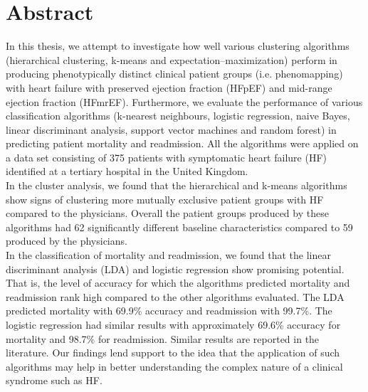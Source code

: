 \documentclass[../thesis.tex]{subfiles}
\begin{document}
\chapter*{Abstract}

\noindent In this thesis, we attempt to investigate how well various clustering algorithms (hierarchical clustering, k-means and expectation–maximization) perform in producing phenotypically distinct clinical patient groups (i.e. phenomapping) with heart failure with preserved ejection fraction (HFpEF) and mid-range ejection fraction (HFmrEF). Furthermore, we evaluate the performance of various classification algorithms (k-nearest neighbours, logistic regression, naive Bayes, linear discriminant analysis, support vector machines and random forest) in predicting patient mortality and readmission. All the algorithms were applied on a data set consisting of 375 patients with symptomatic heart failure (HF) identified at a tertiary hospital in the United Kingdom.\\
\indent In the cluster analysis, we found that the hierarchical and k-means algorithms show signs of clustering more mutually exclusive patient groups with HF compared to the physicians. Overall the patient groups produced by these algorithms had 62 significantly different baseline characteristics compared to 59 produced by the physicians. \\
\indent In the classification of mortality and readmission, we found that the linear discriminant analysis (LDA) and logistic regression show promising potential. That is, the level of accuracy for which the algorithms predicted mortality and readmission rank high compared to the other algorithms evaluated. The LDA predicted mortality with 69.9\% accuracy and readmission with 99.7\%. The logistic regression had similar results with approximately 69.6\% accuracy for mortality and 98.7\% for readmission. Similar results are reported in the literature. Our findings lend support to the idea that the application of such algorithms may help in better understanding the complex nature of a clinical syndrome such as HF.
\end{document}
